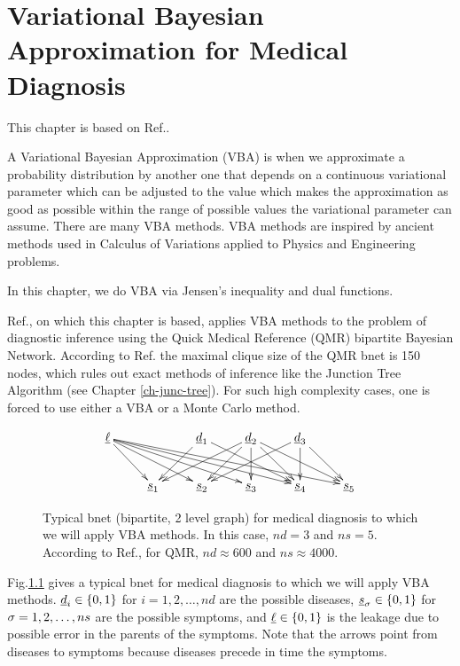 \chapter{Variational Bayesian Approximation
for Medical Diagnosis}
\label{ch-var-bay-medical}

This chapter is based
on Ref.\cite{jaak-jordan}.

A Variational Bayesian Approximation (VBA)
is when we approximate
a probability distribution
by another one that depends
on a continuous variational parameter which can
be adjusted to the value which
makes the approximation
as good as possible
within the range of possible values
the variational parameter
can assume.
There are many VBA methods.
VBA methods are inspired by 
ancient  methods
used in Calculus 
of Variations applied to Physics
and Engineering problems.

In this chapter,
we do VBA  via
Jensen's inequality and
dual functions.

Ref.\cite{jaak-jordan}, on which
this chapter is based,
applies VBA methods to the problem of diagnostic inference using the Quick Medical Reference (QMR) bipartite Bayesian Network. 
According to Ref.\cite{jaak-jordan} 
the maximal clique size of the QMR 
bnet is
150 nodes, which rules out exact methods
of inference like the Junction Tree Algorithm
(see Chapter \ref{ch-junc-tree}).
For such high complexity cases,
one is forced to use
either a VBA or a Monte Carlo method.

\begin{figure}[h!]
$$\xymatrix{
\ul{\ell}
\ar[dr]\ar[drr]\ar[drrr]\ar[drrrr]\ar[drrrrr]
&
&\rvd_1\ar[dl]\ar[drr]
&\rvd_2\ar[dll]\ar[dl]\ar[dr]\ar[d]\ar[drr]
&\rvd_3\ar[dll]\ar[d]\ar[dr]
\\
&\rvs_1
&\rvs_2
&\rvs_3
&\rvs_4
&\rvs_5
}$$
\caption{
Typical bnet (bipartite, 2 level graph) 
for medical diagnosis
to which we will apply VBA
methods.
In this case, $nd=3$ and
$ns=5$. 
According to Ref.\cite{jaak-jordan},
for QMR, $nd\approx 600$ 
and $ns\approx 4000$.
}
\label{fig-var-bay-med-bnet}
\end{figure}

Fig.\ref{fig-var-bay-med-bnet}
gives a typical bnet
for medical diagnosis
to which we will apply VBA methods.
${\underline{d}}_i\in \{0,1\}$
for $i=1,2, \ldots, nd$
are the possible diseases,
${\underline{s}}_\sigma\in\{0,1\}$ 
for $\sigma=1,2, \ldots, ns$ are the possible
symptoms, and $\underline{\ell}\in\{0,1\}$
is the leakage  due to 
possible error in 
the parents of the symptoms.
Note that the 
arrows point from
diseases to symptoms
because diseases precede
in time
the symptoms.

